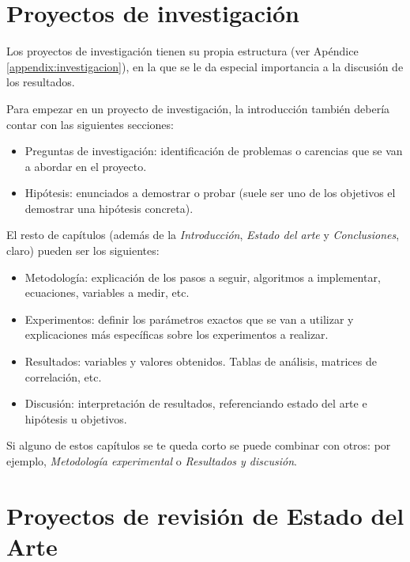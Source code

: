 \section{Proyectos de investigación}
Los proyectos de investigación tienen su propia estructura (ver Apéndice \ref{appendix:investigacion}), en la que se le da especial importancia a la discusión de los resultados. 

Para empezar en un proyecto de investigación, la introducción también debería contar con las siguientes secciones:
    \begin{itemize}
                \item Preguntas de investigación: identificación de problemas o carencias que se van a abordar en el proyecto.
                \item Hipótesis: enunciados a demostrar o probar (suele ser uno de los objetivos el demostrar una hipótesis concreta).
                
    \end{itemize}

El resto de capítulos (además de la \textit{Introducción}, \textit{Estado del arte} y \textit{Conclusiones}, claro) pueden ser los siguientes:
\begin{itemize}
    \item Metodología: explicación de los pasos a seguir, algoritmos a implementar, ecuaciones, variables a medir, etc.
    \item Experimentos: definir los parámetros exactos que se van a utilizar y explicaciones más específicas sobre los experimentos a realizar.
    \item Resultados: variables y valores obtenidos. Tablas de análisis, matrices de correlación, etc.
    \item Discusión: interpretación de resultados, referenciando estado del arte e hipótesis u objetivos.
\end{itemize}
    
Si alguno de estos capítulos se te queda corto se puede combinar con otros: por ejemplo, \textit{Metodología experimental} o \textit{Resultados y discusión}.
        
\section{Proyectos de revisión de Estado del Arte} 

